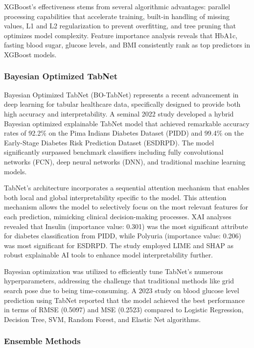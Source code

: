 XGBoost's effectiveness stems from several algorithmic advantages: parallel processing capabilities that accelerate training, built-in handling of missing values, L1 and L2 regularization to prevent overfitting, and tree pruning that optimizes model complexity. Feature importance analysis reveals that HbA1c, fasting blood sugar, glucose levels, and BMI consistently rank as top predictors in XGBoost models.

\subsubsection{Bayesian Optimized TabNet}

Bayesian Optimized TabNet (BO-TabNet) represents a recent advancement in deep learning for tabular healthcare data, specifically designed to provide both high accuracy and interpretability. A seminal 2022 study developed a hybrid Bayesian optimized explainable TabNet model that achieved remarkable accuracy rates of 92.2\% on the Pima Indians Diabetes Dataset (PIDD) and 99.4\% on the Early-Stage Diabetes Risk Prediction Dataset (ESDRPD). The model significantly surpassed benchmark classifiers including fully convolutional networks (FCN), deep neural networks (DNN), and traditional machine learning models.

TabNet's architecture incorporates a sequential attention mechanism that enables both local and global interpretability specific to the model. This attention mechanism allows the model to selectively focus on the most relevant features for each prediction, mimicking clinical decision-making processes. XAI analyses revealed that Insulin (importance value: 0.301) was the most significant attribute for diabetes classification from PIDD, while Polyuria (importance value: 0.206) was most significant for ESDRPD. The study employed LIME and SHAP as robust explainable AI tools to enhance model interpretability further.

Bayesian optimization was utilized to efficiently tune TabNet's numerous hyperparameters, addressing the challenge that traditional methods like grid search pose due to being time-consuming. A 2023 study on blood glucose level prediction using TabNet reported that the model achieved the best performance in terms of RMSE (0.5097) and MSE (0.2523) compared to Logistic Regression, Decision Tree, SVM, Random Forest, and Elastic Net algorithms.

\subsubsection{Ensemble Methods}

